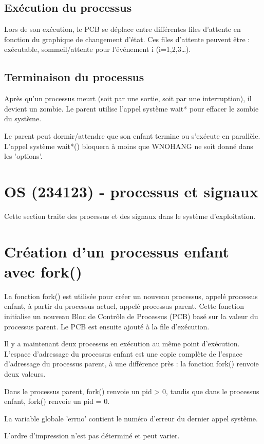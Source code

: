 \documentclass[12pt]{report}
\begin{document}
\subsection{Exécution du processus}

Lors de son exécution, le PCB se déplace entre différentes files d'attente en fonction du graphique de changement d'état. Ces files d'attente peuvent être : exécutable, sommeil/attente pour l'événement i (i=1,2,3…).

\subsection{Terminaison du processus}

Après qu'un processus meurt (soit par une sortie, soit par une interruption), il devient un zombie. Le parent utilise l'appel système wait* pour effacer le zombie du système.

Le parent peut dormir/attendre que son enfant termine ou s'exécute en parallèle. L'appel système wait*() bloquera à moins que WNOHANG ne soit donné dans les 'options'.

\section{OS (234123) - processus et signaux}

Cette section traite des processus et des signaux dans le système d'exploitation.

\section{Création d'un processus enfant avec fork()}

La fonction fork() est utilisée pour créer un nouveau processus, appelé processus enfant, à partir du processus actuel, appelé processus parent. Cette fonction initialise un nouveau Bloc de Contrôle de Processus (PCB) basé sur la valeur du processus parent. Le PCB est ensuite ajouté à la file d'exécution.

Il y a maintenant deux processus en exécution au même point d'exécution. L'espace d'adressage du processus enfant est une copie complète de l'espace d'adressage du processus parent, à une différence près : la fonction fork() renvoie deux valeurs.

Dans le processus parent, fork() renvoie un pid > 0, tandis que dans le processus enfant, fork() renvoie un pid = 0.

La variable globale 'errno' contient le numéro d'erreur du dernier appel système.

L'ordre d'impression n'est pas déterminé et peut varier.
\end{document}

